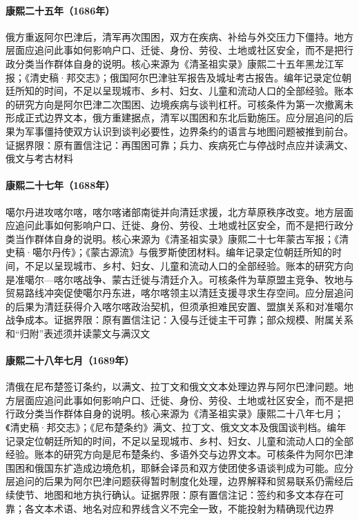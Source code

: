\hypertarget{social:EQ-1686-ALBAZIN-SECOND}{}\paragraph{康熙二十五年（1686年）}俄方重返阿尔巴津后，清军再次围困，双方在疾病、补给与外交压力下僵持。地方层面应追问此事如何影响户口、迁徙、身份、劳役、土地或社区安全，而不是把行政分类当作群体自身的说明。核心来源为《清圣祖实录》康熙二十五年黑龙江军报；《清史稿·邦交志》；俄国阿尔巴津驻军报告及城址考古报告。编年记录定位朝廷所知的时间，不足以呈现城市、乡村、妇女、儿童和流动人口的全部经验。账本的研究方向是阿尔巴津二次围困、边境疾病与谈判杠杆。可核条件为第一次撤离未形成正式边界文本，俄方重建据点，清军以围困和东北后勤施压。应分层追问的后果为军事僵持使双方认识到谈判必要性，边界条约的语言与地图问题被推到前台。证据界限：原有置信注记：再围困可靠；兵力、疾病死亡与停战时点应并读满文、俄文与考古材料
\hypertarget{social:EQ-1688-GALDAN-KHALKHA}{}\paragraph{康熙二十七年（1688年）}噶尔丹进攻喀尔喀，喀尔喀诸部南徙并向清廷求援，北方草原秩序改变。地方层面应追问此事如何影响户口、迁徙、身份、劳役、土地或社区安全，而不是把行政分类当作群体自身的说明。核心来源为《清圣祖实录》康熙二十七年蒙古军报；《清史稿·噶尔丹传》；《蒙古源流》与俄罗斯使团材料。编年记录定位朝廷所知的时间，不足以呈现城市、乡村、妇女、儿童和流动人口的全部经验。账本的研究方向是准噶尔—喀尔喀战争、蒙古迁徙与清廷介入。可核条件为草原盟主竞争、牧地与贸易路线冲突促使噶尔丹东进，喀尔喀领主以清廷支援寻求生存空间。应分层追问的后果为清廷获得介入喀尔喀政治契机，但须承担难民安置、盟旗关系和对准噶尔战争成本。证据界限：原有置信注记：入侵与迁徙主干可靠；部众规模、附属关系和“归附”表述须并读蒙文与满汉文
\hypertarget{social:EQ-1689-NERCHINSK}{}\paragraph{康熙二十八年七月（1689年）}清俄在尼布楚签订条约，以满文、拉丁文和俄文文本处理边界与阿尔巴津问题。地方层面应追问此事如何影响户口、迁徙、身份、劳役、土地或社区安全，而不是把行政分类当作群体自身的说明。核心来源为《清圣祖实录》康熙二十八年七月；《清史稿·邦交志》；《尼布楚条约》满文、拉丁文、俄文文本及俄国谈判档。编年记录定位朝廷所知的时间，不足以呈现城市、乡村、妇女、儿童和流动人口的全部经验。账本的研究方向是尼布楚条约、多语外交与边界文本。可核条件为阿尔巴津围困和俄国东扩造成边境危机，耶稣会译员和双方使团使多语谈判成为可能。应分层追问的后果为阿尔巴津问题获得暂时制度化处理，边界解释和贸易联系仍需经后续使节、地图和地方执行确认。证据界限：原有置信注记：签约和多文本存在可靠；各文本术语、地名对应和界线含义不完全一致，不能投射为精确现代边界
